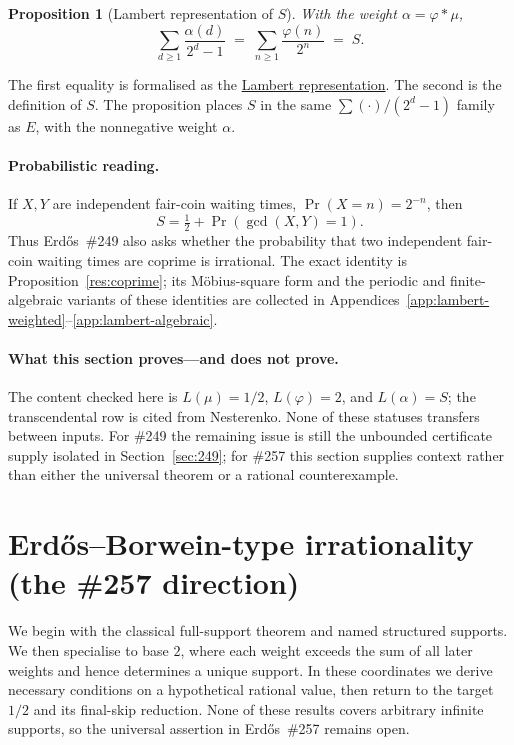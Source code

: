 \documentclass[11pt]{article}
\newcommand{\commit}{312b96c0d149ed466725c62d4ef24cfc91bca34e}
\newcommand{\repobase}{https://github.com/wcook04/plectis-lean-erdos249-257/blob/\commit}
\newcommand{\PK}{Erdos249257}
\newcommand{\lword}[4]{\href{\repobase/\PK/#1\#L#2}{#4}}
\newtheorem{proposition}[theorem]{Proposition}
\theoremstyle{definition}
\theoremstyle{remark}
\newcommand{\ph}{\varphi}
\begin{document}
\begin{proposition}[Lambert representation of \(S\)]\label{res:lift}
With the weight $\alpha=\ph*\mu$,
\[
\sum_{d\ge1}\frac{\alpha(d)}{2^d-1}\;=\;\sum_{n\ge1}\frac{\ph(n)}{2^n}\;=\;S.
\]
\end{proposition}
\noindent The first equality is formalised as the
\lword{CertificateKernel.lean}{18117}{tsum_primWeight_div_two_pow_sub_one_eq_totient_series}{Lambert representation}.
The second is the definition of \(S\).  The proposition places \(S\) in the
same \(\sum(\cdot)/(2^d-1)\) family as \(E\), with the nonnegative weight
\(\alpha\).

\paragraph{Probabilistic reading.}
If \(X,Y\) are independent fair-coin waiting times,
\(\Pr(X=n)=2^{-n}\), then
\[
 S=\tfrac12+\Pr(\gcd(X,Y)=1).
\]
Thus Erd\H{o}s~\#249 also asks whether the probability that two independent
fair-coin waiting times are coprime is irrational.  The exact identity is
Proposition~\ref{res:coprime}; its M\"obius-square form and the periodic and
finite-algebraic variants of these identities are collected in
Appendices~\ref{app:lambert-weighted}--\ref{app:lambert-algebraic}.

\paragraph{What this section proves---and does not prove.}
The content checked here is
\(L(\mu)=1/2\), \(L(\ph)=2\), and \(L(\alpha)=S\); the transcendental row is
cited from Nesterenko.  None of these statuses transfers between inputs.  For
\#249 the remaining issue is still the unbounded certificate supply isolated
in Section~\ref{sec:249}; for \#257 this section supplies context rather than
either the universal theorem or a rational counterexample.

\section{Erd\H{o}s--Borwein-type irrationality (the \#257 direction)}\label{sec:eb}

We begin with the classical full-support theorem and named structured
supports.  We then specialise to base \(2\), where each weight exceeds the sum
of all later weights and hence determines a unique support.  In these
coordinates we derive necessary conditions on a hypothetical rational value,
then return to the target \(1/2\) and its final-skip reduction.  None of these
results covers arbitrary infinite supports, so the universal assertion in
Erd\H{o}s~\#257 remains open.
\end{document}
